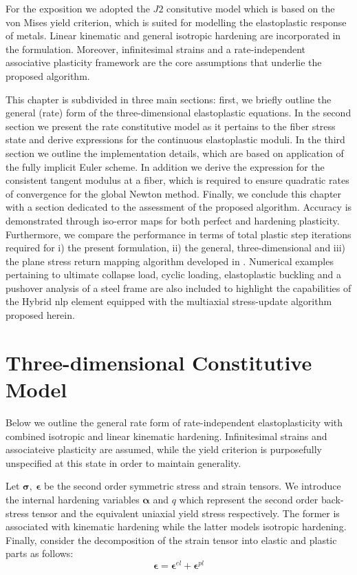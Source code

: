 For the exposition we adopted the $J2$ consitutive model which is based on the 
von Mises yield criterion, which is suited for modelling the elastoplastic 
response of metals. Linear kinematic and general isotropic hardening are 
incorporated in the formulation. Moreover, infinitesimal strains and a 
rate-independent associative plasticity framework are the core assumptions that 
underlie the proposed algorithm. 

This chapter is subdivided in three main 
sections: first, we briefly outline the general (rate) form of the 
three-dimensional elastoplastic equations. In the second section we present the 
rate constitutive model as it pertains to the fiber stress state and derive 
expressions for the continuous elastoplastic moduli. In the third 
section we outline the implementation details, which are based on application 
of the fully implicit Euler scheme. In addition we derive the expression for 
the consistent tangent modulus at a fiber, which is required to ensure 
quadratic rates of convergence for the global Newton method. Finally, we 
conclude this chapter with a section dedicated to the assessment of the 
proposed algorithm. Accuracy is demonstrated through iso-error maps for both 
perfect and hardening plasticity. Furthermore, we compare the performance in 
terms of total plastic step iterations required for i) the present formulation, 
ii) the general, three-dimensional and iii) the plane stress return mapping 
algorithm developed in \cite{Simo1986}. Numerical examples pertaining to 
ultimate collapse load, cyclic loading, elastoplastic buckling and a pushover 
analysis of a steel frame are also included to highlight the capabilities of 
the Hybrid \acrshort{nlp} element equipped with the multiaxial stress-update 
algorithm proposed herein.


\section{Three-dimensional Constitutive Model}\label{section:CH3-S2}
Below we outline the general rate form of rate-independent elastoplasticity 
with combined isotropic and linear kinematic hardening. Infinitesimal strains 
and associateive plasticity are assumed, while the yield criterion is 
purposefully unspecified at this state in order to maintain generality. 

Let $\bm{\sigma},\ \bm{\epsilon}$ be the second order symmetric stress and 
strain tensors. We introduce the internal hardening variables $\bm{\alpha}$ and 
$q$ which represent the second order back-stress tensor and the equivalent 
uniaxial yield stress respectively. The former is associated with kinematic 
hardening while the latter models isotropic hardening. Finally, consider the 
decomposition of the strain tensor into elastic and plastic parts as follows:
\begin{equation}
	\bm{\epsilon} = \bm{\epsilon}^{el} + \bm{\epsilon}^{pl}
	\label{eq:DECOMP_STRAIN}
\end{equation} 

